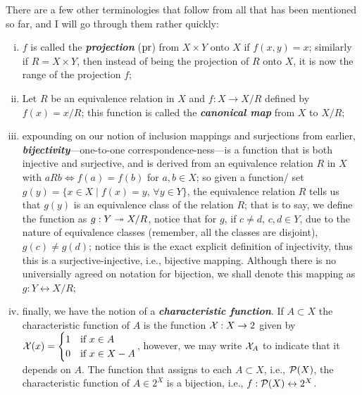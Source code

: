 \documentclass{report}
\begin{document}

There are a few other terminologies that follow from all that has been mentioned so far, and I will go through them rather quickly: 
\begin{enumerate}[i.]
  \item \( f \) is called the \textbf{\textit{projection}} (\( \operatorname{pr} \)) from \( X \times  Y \) onto \( X \) if \( f(x,y)=x \); similarly if \( R=X \times Y \), then instead of being the projection of \( R \) onto \( X \), it is now the range of the projection \( f \);
  \item Let \( R \) be an equivalence relation in \( X \) and \( f : X \to  X / R\) defined by \( f(x)=x / R \); this function is called the \textbf{\textit{canonical map}} from \( X \) to \( X / R \);
  \item expounding on our notion of inclusion mappings and surjections from earlier, \textbf{\textit{bijectivity}}---one-to-one correspondence-ness---is a function that is both injective and surjective, and is derived from an equivalence relation \( R \) in \( X \) with \( aRb \iff f(a)=f(b) \) for \( a,b \in X \); so given a function/ set \( g(y)=\{x \in X \mid f(x)=y, \, \forall  y \in  Y\}\), the equivalence relation \( R \) tells us that \( g(y) \) is an equivalence class of the relation \( R \); that is to say, we define the function as \( g: Y \twoheadrightarrow X / R \), notice that for \( g \), if \( c\neq d, \, c,d \in Y \), due to the nature of equivalence classes (remember, all the classes are disjoint), \( g(c)\neq g(d) \); notice this is the exact explicit definition of injectivity, thus this is a surjective-injective, i.e., bijective mapping. Although there is no universially agreed on notation for bijection, we shall denote this mapping as \( g : Y \leftrightarrow X / R \);
  \item finally, we have the notion of a \textbf{\textit{characteristic function}}. If \( A \subset X \) the characteristic function of \( A \) is the function \( \mathcal{X} : X \to 2 \) given by \( \mathcal{X}(x)=\begin{cases}
      1 & \text{if } x \in  A \\ 
      0 & \text{if } x\in X-A
  \end{cases} \), however, we may write \( \mathcal{X}_A \) to indicate that it depends on \( A \). The function that assigns to each \( A \subset X \), i.e., \( \mathcal{P}(X) \), the characteristic function of \( A  \in  2^X\) is a bijection, i.e., \( f : \mathcal{P}(X) \leftrightarrow 2^X \).
\end{enumerate}
\end{document}

